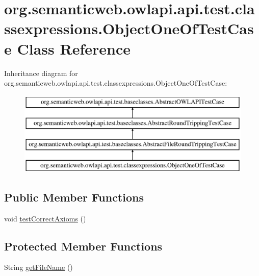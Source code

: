 \hypertarget{classorg_1_1semanticweb_1_1owlapi_1_1api_1_1test_1_1classexpressions_1_1_object_one_of_test_case}{\section{org.\-semanticweb.\-owlapi.\-api.\-test.\-classexpressions.\-Object\-One\-Of\-Test\-Case Class Reference}
\label{classorg_1_1semanticweb_1_1owlapi_1_1api_1_1test_1_1classexpressions_1_1_object_one_of_test_case}
}
Inheritance diagram for org.\-semanticweb.\-owlapi.\-api.\-test.\-classexpressions.\-Object\-One\-Of\-Test\-Case\-:\begin{figure}[H]
\begin{center}
\leavevmode
\includegraphics[height=4.000000cm]{classorg_1_1semanticweb_1_1owlapi_1_1api_1_1test_1_1classexpressions_1_1_object_one_of_test_case}
\end{center}
\end{figure}
\subsection*{Public Member Functions}
\begin{DoxyCompactItemize}
\item 
void \hyperlink{classorg_1_1semanticweb_1_1owlapi_1_1api_1_1test_1_1classexpressions_1_1_object_one_of_test_case_a75f98a0ce34196f5142abe61ca1b0cab}{test\-Correct\-Axioms} ()
\end{DoxyCompactItemize}
\subsection*{Protected Member Functions}
\begin{DoxyCompactItemize}
\item 
String \hyperlink{classorg_1_1semanticweb_1_1owlapi_1_1api_1_1test_1_1classexpressions_1_1_object_one_of_test_case_add0a544bb60c45e2b358ef4716dfa9cc}{get\-File\-Name} ()
\end{DoxyCompactItemize}


